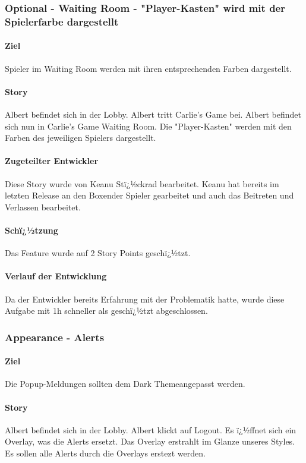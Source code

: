 \documentclass[12pt, titlepage]{scrartcl}
\begin{document}
			\subsubsection{Optional - Waiting Room - "Player-Kasten" wird mit der Spielerfarbe dargestellt}
			\paragraph{Ziel} Spieler im Waiting Room werden mit ihren entsprechenden Farben dargestellt.
			\paragraph{Story} Albert befindet sich in der Lobby. Albert tritt Carlie's Game bei. Albert befindet sich nun in Carlie's Game Waiting Room. Die "Player-Kasten" werden mit den Farben des jeweiligen Spielers dargestellt.
			\paragraph{Zugeteilter Entwickler} Diese Story wurde von Keanu Stï¿½ckrad bearbeitet. Keanu hat bereits im letzten Release an den \glqq Boxen\grqq der Spieler gearbeitet und auch das Beitreten und Verlassen bearbeitet.
			\paragraph{Schï¿½tzung}
			Das Feature wurde auf 2 Story Points geschï¿½tzt.
			\paragraph{Verlauf der Entwicklung} 
			Da der Entwickler bereits Erfahrung mit der Problematik hatte, wurde diese Aufgabe mit 1h schneller als geschï¿½tzt abgeschlossen.
			
			\subsubsection{Appearance - Alerts}
			\paragraph{Ziel} Die Popup-Meldungen sollten dem \glqq Dark Theme\grqq angepasst werden.
			\paragraph{Story} Albert befindet sich in der Lobby. Albert klickt auf Logout. Es ï¿½ffnet sich ein Overlay, was die Alerts ersetzt. Das Overlay erstrahlt im Glanze unseres Styles. Es sollen alle Alerts durch die Overlays erstezt werden.
\end{document}

